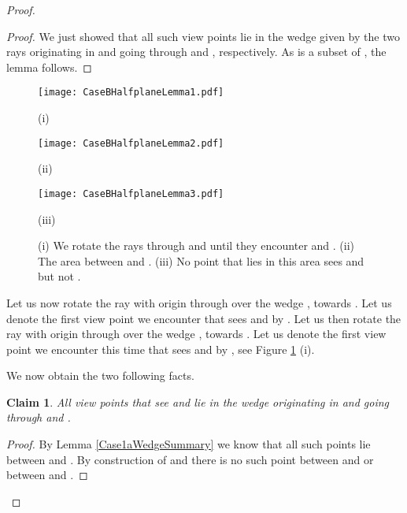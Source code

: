 \documentclass[11pt]{article}
\newtheorem{claim}{Claim}
\begin{document}
\begin{proof}
\begin{proof}
We just showed that all such view points  lie in the wedge  
given by the two rays originating in  and going through  and , respectively. 
As  is a subset of , the lemma follows.
\end{proof}


\begin{figure}[hbtp]\begin{minipage}[t]{0.30\textwidth}
\begin{center}\texttt{[image: CaseBHalfplaneLemma1.pdf]}

(i)
\end{center}\end{minipage}
\hfill
\begin{minipage}[t]{0.20\textwidth}
\begin{center}\texttt{[image: CaseBHalfplaneLemma2.pdf]}

(ii)
\end{center}\end{minipage}
\hfill
\begin{minipage}[t]{0.28\textwidth}
\begin{center}\texttt{[image: CaseBHalfplaneLemma3.pdf]}

(iii)
\end{center}\end{minipage}
\caption{(i) We rotate the rays through  and  until they encounter  and .  
(ii) The area between  and .
(iii) No point  that lies in this area sees  and  but not .}
\label{CaseBHalfplaneLemma-fig}
\end{figure}

Let us now rotate the ray with origin  through   over the wedge , towards . Let us denote the first view point we encounter that sees  and   by . Let us then rotate the ray with origin  through   over the wedge , towards . Let us denote the first view point we encounter this time that sees  and   by , 
see Figure \ref{CaseBHalfplaneLemma-fig} (i).
 
We now obtain the two following facts.

\begin{claim} \label{v_1v_2-claim}
All view points that see  and  lie in the wedge originating in  and going through  and .
\end{claim}

\begin{proof}
By Lemma \ref{Case1aWedgeSummary} we know that all such points lie between  and . By construction of  and  there is no such point between  and  or between  and .
\end{proof}


\end{proof}
\end{document}

